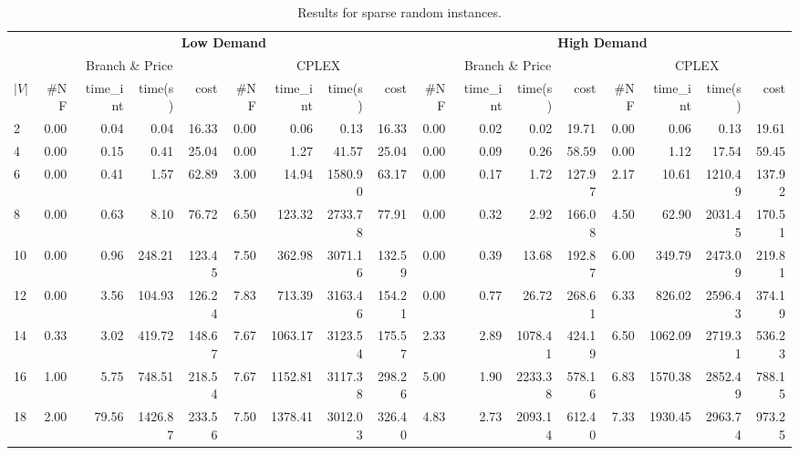 \documentclass[conference]{IEEEtran}
\begin{document}
\begin{table*}[h]
\begin{center}
\caption{Results for sparse random instances.}\label{tab:sparse}
\begin{tabular} {l | r r r r | r r r r | r r r r | r r r r }
\hline
      &  \multicolumn{8}{c|}{ \textbf{Low Demand} } & \multicolumn{8}{c}{ \textbf{High Demand}} \\
      &  \multicolumn{4}{c|}{Branch \& Price} & \multicolumn{4}{c|}{CPLEX}    &       \multicolumn{4}{c|}{Branch \& Price} & \multicolumn{4}{c}{CPLEX}               \\  
$|V|$ & \#NF &  time\_int    &  time(s)       &  cost          &  \#NF &  time\_int  &  time(s)       &  cost  & \#NF &  time\_int    &  time(s)       &  cost          &  \#NF &  time\_int  &  time(s)       &  cost \\
\hline      
2&   0.00  &   0.04    &   0.04     &   16.33  & 0.00 & 0.06 & 0.13 & 16.33         & 0.00  &   0.02    &   0.02     &   19.71   & 0.00 & 0.06 & 0.13 & 19.61         \\  
4&   0.00  &   0.15    &   0.41     &   25.04  & 0.00 & 1.27 & 41.57 & 25.04        & 0.00  &   0.09    &   0.26     &   58.59   & 0.00 & 1.12 & 17.54 & 59.45        \\
6&   0.00  &   0.41    &   1.57     &   62.89  & 3.00 & 14.94 & 1580.90 & 63.17     & 0.00  &   0.17    &   1.72     &   127.97  & 2.17 & 10.61 & 1210.49 & 137.92    \\
8&   0.00  &   0.63    &   8.10     &   76.72  & 6.50 & 123.32 & 2733.78 & 77.91    & 0.00  &   0.32    &   2.92     &   166.08  & 4.50 & 62.90 & 2031.45 & 170.51    \\
10&  0.00  &   0.96    &   248.21   &   123.45 & 7.50 & 362.98 & 3071.16 & 132.59   & 0.00  &   0.39    &   13.68    &   192.87  & 6.00 & 349.79 & 2473.09 & 219.81   \\
12&  0.00  &   3.56    &   104.93   &   126.24 & 7.83 & 713.39 & 3163.46 & 154.21   & 0.00  &   0.77    &   26.72    &   268.61  & 6.33 & 826.02 & 2596.43 & 374.19   \\
14&  0.33  &   3.02    &   419.72   &   148.67 & 7.67 & 1063.17 & 3123.54 & 175.57  & 2.33  &   2.89    &   1078.41  &   424.19  & 6.50 & 1062.09 & 2719.31 & 536.23  \\
16&  1.00  &   5.75    &   748.51   &   218.54 & 7.67 & 1152.81 & 3117.38 & 298.26  & 5.00  &   1.90    &   2233.38  &   578.16  & 6.83 & 1570.38 & 2852.49 & 788.15  \\
18&  2.00  &   79.56   &   1426.87  &   233.56 & 7.50 & 1378.41 & 3012.03 & 326.40  & 4.83  &   2.73    &   2093.14  &   612.40  & 7.33 & 1930.45 & 2963.74 & 973.25  \\ 
\hline
\end{tabular} 
\end{center}
\end{table*}
\end{document}
